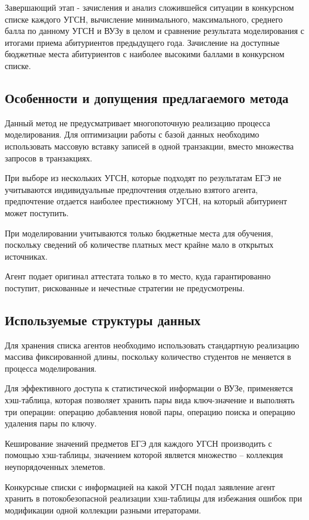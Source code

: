 Завершающий этап - зачисления и анализ сложившейся ситуации в конкурсном списке каждого УГСН, вычисление минимального, максимального, среднего балла по данному УГСН и ВУЗу в целом и сравнение результата моделирования с итогами приема абитуриентов предыдущего года. Зачисление на доступные бюджетные места абитуриентов с наиболее высокими баллами в конкурсном списке.

\subsection{Особенности и допущения предлагаемого метода}

Данный метод не предусматривает многопоточную реализацию процесса моделирования. Для оптимизации работы с базой данных необходимо использовать массовую вставку записей в одной транзакции, вместо множества запросов в транзакциях. 

При выборе из нескольких УГСН, которые подходят по результатам ЕГЭ не учитываются индивидуальные предпочтения отдельно взятого агента, предпочтение отдается наиболее престижному УГСН, на который абитуриент может поступить. 

При моделировании учитываются только бюджетные места для обучения, поскольку сведений об количестве платных мест крайне мало в открытых источниках.

Агент подает оригинал аттестата только в то место, куда гарантированно поступит, рискованные и нечестные стратегии не предусмотрены.

\subsection{Используемые структуры данных}

Для хранения списка агентов необходимо использовать стандартную реализацию массива фиксированной длины, поскольку количество студентов не меняется в процесса моделирования.

Для эффективного доступа к статистической информации о ВУЗе, применяется хэш-таблица, которая позволяет хранить пары вида ключ-значение и выполнять три операции: операцию добавления новой пары, операцию поиска и операцию удаления пары по ключу.

Кеширование значений предметов ЕГЭ для каждого УГСН производить с помощью хэш-таблицы, значением которой является множество – коллекция неупорядоченных элеметов.

Конкурсные списки с информацией на какой УГСН подал заявление агент хранить в потокобезопасной реализации хэш-таблицы для избежания ошибок при модификации одной коллекции разными итераторами.



\pagebreak